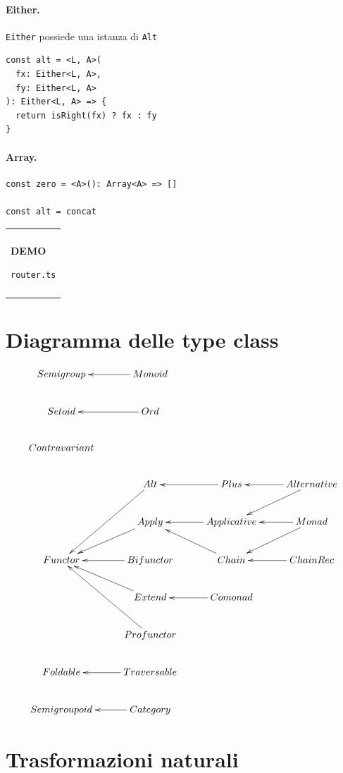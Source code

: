 \documentclass[12pt]{article}
\newenvironment{demo}
    {\begin{center}
    \begin{tabular}{|p{0.9\textwidth}|}
    \hline\\
    }
    {
    \\\\\hline
    \end{tabular}
    \end{center}
    }
\begin{document}
\paragraph{Either.} \texttt{Either} possiede una istanza di \texttt{Alt}

\begin{verbatim}
const alt = <L, A>(
  fx: Either<L, A>,
  fy: Either<L, A>
): Either<L, A> => {
  return isRight(fx) ? fx : fy
}
\end{verbatim}

\paragraph{Array.}

\begin{verbatim}
const zero = <A>(): Array<A> => []

const alt = concat
\end{verbatim}

\begin{demo}
\begin{center}
\textbf{DEMO}

\texttt{router.ts}
\end{center}
\end{demo}

\newpage

\section{Diagramma delle type class}

\[
\xymatrix{
  Semigroup & Monoid \ar[l] \\
  Setoid & Ord \ar[l] \\
  Contravariant \\
  & Alt \ar[ldd] & Plus \ar[l] & Alternative \ar[l] \ar[ld] \\
  & Apply \ar[ld] & Applicative \ar[l] & Monad \ar[l] \ar[ld] \\
  Functor & Bifunctor \ar[l] & Chain \ar[lu] & ChainRec \ar[l] \\
  & Extend \ar[lu] & Comonad \ar[l] \\
  & Profunctor \ar[luu] \\
  Foldable & Traversable \ar[l] \\
  Semigroupoid & Category \ar[l] \\
}
\]

\newpage

\section{Trasformazioni naturali}
\end{document}
